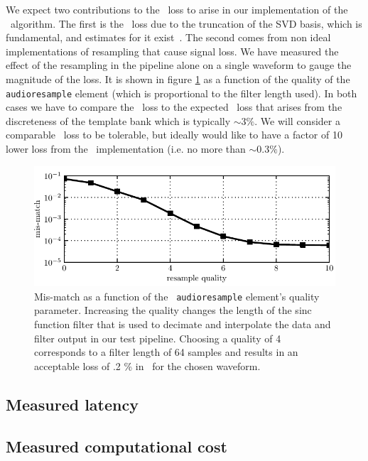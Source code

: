 We expect two contributions to the \SNR\ loss to arise in our implementation of
the \lloid\ algorithm.  The first is the \SNR\ loss due to the truncation of
the SVD basis, which is fundamental, and estimates for it
exist~\cite{Cannon:2010p10398}.  The second comes from non ideal
implementations of resampling that cause signal loss.  We have measured the
effect of the resampling in the pipeline alone on a single waveform to gauge
the magnitude of the loss.  It is shown in figure \ref{fig:resamp_mm} as a
function of the quality of the {\tt audioresample} element (which is
proportional to the filter length used).  In both cases we have to compare the
\SNR\ loss to the expected \SNR\ loss that arises from the discreteness of the
template bank which is typically $\sim 3\%$.  We will consider a comparable
\SNR\ loss to be tolerable, but ideally would like to have a factor of 10 lower
loss from the \lloid\ implementation (i.e. no more than $\sim 0.3 \%$).  
%
\begin{figure}
\includegraphics{resamp_mm.pdf}
\caption{\label{fig:resamp_mm}Mis-match as a function of the {\tt
audioresample} element's quality parameter.  Increasing the quality changes the
length of the sinc function filter that is used to decimate and interpolate the
data and filter output in our test pipeline.  Choosing a quality of 4
corresponds to a filter length of 64 samples and results in an acceptable loss
of .2 \% in \SNR\ for the chosen waveform.}
\end{figure}



\subsection{Measured latency}

\subsection{Measured computational cost}

